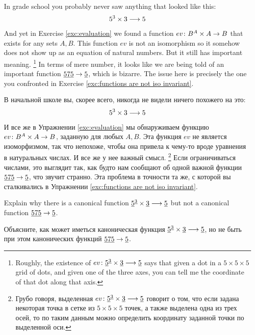 \documentclass[CT4S-EN-RU]{subfiles}
\begin{document}
\begin{blockENG}
In grade school you probably never saw anything that looked like this:
$$5^3\times 3\longrightarrow 5$$
And yet in Exercise \ref{exc:evaluation} we found a function $ev\colon B^A\times A\rightarrow B$ that exists for any sets $A,B$. This function $ev$ is not an isomorphism so it somehow does not show up as an equation of natural numbers. But it still has important meaning.%
\footnote{Roughly, the existence of $ev\colon\underline{5}^{\underline{3}}\times\underline{3}\longrightarrow \underline{5}$ says that given a dot in a $5\times 5\times 5$ grid of dots, and given one of the three axes, you can tell me the coordinate of that dot along that axis.} In terms of mere number, it looks like we are being told of an important function $\underline{575}\rightarrow\underline{5}$, which is bizarre. The issue here is precisely the one you confronted in Exercise \ref{exc:functions are not iso invariant}.
\end{blockENG}

\begin{blockRUS}
В начальной школе вы, скорее всего, никогда не видели ничего похожего на это:
$$5^3\times 3\longrightarrow 5$$
И все же в Упражнении \ref{exc:evaluation} мы обнаруживаем функцию $ev\colon B^A\times A\rightarrow B$, заданную для любых $A,B$. Эта функция $ev$ не является изоморфизмом, так что непохоже, чтобы она привела к чему-то вроде уравнения в натуральных числах. И все же у нее важный смысл.%
\footnote{Грубо говоря, выделенная $ev\colon\underline{5}^{\underline{3}}\times\underline{3}\longrightarrow \underline{5}$ говорит о том, что если задана некоторая точка в сетке из $5\times 5\times 5$ точек, а также выделена одна из трех осей, то по таким данным можно определить координату заданной точки по выделенной оси.}
Если ограничиваться числами, это выглядит так, как будто нам сообщают об одной важной функции $\underline{575}\rightarrow\underline{5}$, что звучит странно. Эта проблема в точности та же, с которой вы сталкивались в Упражнении \ref{exc:functions are not iso invariant}.
\end{blockRUS}

\begin{exerciseENG}
Explain why there is a canonical function $\underline{5}^{\underline{3}}\times\underline{3}\longrightarrow \underline{5}$ but not a canonical function $\underline{575}\rightarrow\underline{5}$.
\end{exerciseENG}

\begin{exerciseRUS}
Объясните, как может иметься каноническая функция $\underline{5}^{\underline{3}}\times\underline{3}\longrightarrow \underline{5}$, но не быть при этом канонических функций $\underline{575}\rightarrow\underline{5}$.
\end{exerciseRUS}
\end{document}
